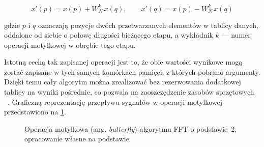 \begin{equation}
x'(p) = x(p) + W_N^{k}\,x(q),
\qquad
x'(q) = x(p) - W_N^{k}\,x(q)
\label{eq:motylek}
\end{equation}

gdzie $p$ i $q$ oznaczają pozycje dwóch przetwarzanych elementów w tablicy danych, oddalone od siebie o połowę długości bieżącego etapu, a wykładnik $k$ — numer operacji motylkowej w obrębie tego etapu.

Istotną cechą tak zapisanej operacji jest to, że obie wartości wynikowe mogą zostać zapisane w tych samych komórkach pamięci, z których pobrano argumenty. Dzięki temu cały algorytm można zrealizować bez rezerwowania dodatkowej tablicy na wyniki pośrednie, co pozwala na zaoszczędzenie zasobów sprzętowych ~\cite{CooleyTurkeyFFT}. Graficzną reprezentację przepływu sygnałów w operacji motylkowej przedstawiono na \cref{fig:motylek-radix2}.

\begin{figure}[ht]
    \centering
    \caption[Operacja motylkowa algorytmu FFT o podstawie 2]{Operacja motylkowa (ang. \textit{butterfly}) algorytmu FFT o podstawie~2, opracowanie własne na podstawie ~\cite{ZielinskiDSP}}
    \label{fig:motylek-radix2}
\end{figure}

